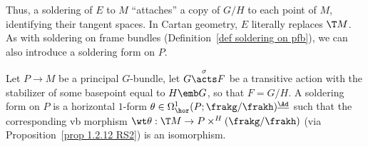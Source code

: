 Thus, a soldering of $E$ to $M$ ``attaches'' a copy of $G\slash H$ to each point of $M$, identifying their tangent spaces. In Cartan geometry, $E$ literally replaces $\T M$. As with soldering on frame bundles (Definition~\ref{def soldering on pfb}), we can also introduce a soldering form on $P$.


\begin{defn}
    Let $P\to M$ be a principal $G$-bundle, let $G\overset{\sigma}{\acts}F$ be a transitive action with the stabilizer of some basepoint equal to $H\emb G$, so that $F=G\slash H$. A soldering form on $P$ is a horizontal $1$-form $\theta\in\Omega^1_{\hor}(P;\frakg\slash\frakh)^{\underline{\Ad}}$ such that the corresponding \gls{vb} morphism $\wt\theta:\T M\to P\times^H(\frakg\slash\frakh)$ (via Proposition~\ref{prop 1.2.12 RS2}) is an isomorphism.
\end{defn}


